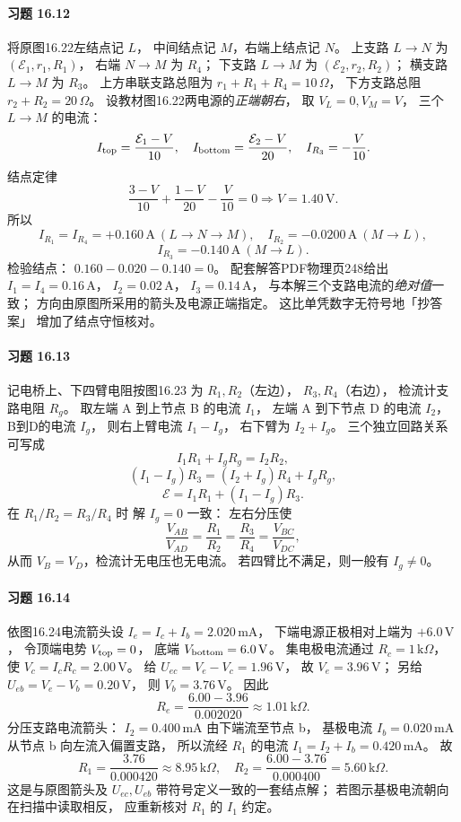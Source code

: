 \paragraph{习题 16.12}
将原图16.22左结点记 \(L\)，
中间结点记 \(M\)，右端上结点记 \(N\)。
上支路 \(L\to N\)
为 \((\mathcal E_1,r_1,R_1)\)，
右端 \(N\to M\) 为 \(R_4\)；
下支路 \(L\to M\)
为 \((\mathcal E_2,r_2,R_2)\)；
横支路 \(L\to M\) 为 \(R_3\)。
上方串联支路总阻为
\(r_1+R_1+R_4=10\,\Omega\)，
下方支路总阻 \(r_2+R_2=20\,\Omega\)。
设教材图16.22两电源的\emph{正端朝右}，
取 \(V_L=0,V_M=V\)，
三个 \(L\to M\) 的电流：
\[
 I_{\rm top}=\frac{\mathcal E_1-V}{10},\quad
 I_{\rm bottom}=\frac{\mathcal E_2-V}{20},\quad
 I_{R_3}=-\frac V{10}.
\]
结点定律
\[
 \frac{3-V}{10}+\frac{1-V}{20}
 -\frac V{10}=0
 \Longrightarrow
 \boxed{V=1.40\,\mathrm V}.
\]
所以
\[
 \boxed{I_{R_1}=I_{R_4}=+0.160\,\mathrm A
 \ (L\to N\to M)},\quad
 \boxed{I_{R_2}=-0.0200\,\mathrm A
 \ (M\to L)},
\]
\[
 \boxed{I_{R_3}=-0.140\,\mathrm A
 \ (M\to L)}.
\]
检验结点：
\(0.160-0.020-0.140=0\)。
配套解答PDF物理页248给出
\(I_1=I_4=0.16\,\mathrm A\)，
\(I_2=0.02\,\mathrm A\)，
\(I_3=0.14\,\mathrm A\)，
与本解三个支路电流的\emph{绝对值}一致；
方向由原图所采用的箭头及电源正端指定。
这比单凭数字无符号地「抄答案」
增加了结点守恒核对。

\paragraph{习题 16.13}
记电桥上、下四臂电阻按图16.23
为 \(R_1,R_2\)（左边），
\(R_3,R_4\)（右边），
检流计支路电阻 \(R_g\)。
取左端 A 到上节点 B 的电流 \(I_1\)，
左端 A 到下节点 D 的电流 \(I_2\)，
B到D的电流 \(I_g\)，
则右上臂电流 \(I_1-I_g\)，
右下臂为 \(I_2+I_g\)。
三个独立回路关系可写成
\[
 I_1R_1+I_gR_g=I_2R_2,
\]
\[
 (I_1-I_g)R_3=(I_2+I_g)R_4+I_gR_g,
\]
\[
 \mathcal E=I_1R_1+(I_1-I_g)R_3.
\]
在
\(R_1/R_2=R_3/R_4\) 时
解 \(I_g=0\) 一致：
左右分压使
\[
 \frac{V_{AB}}{V_{AD}}=
 \frac{R_1}{R_2}
 =\frac{R_3}{R_4}
 =\frac{V_{BC}}{V_{DC}},
\]
从而 \(V_B=V_D\)，检流计无电压也无电流。
若四臂比不满足，则一般有 \(I_g\ne0\)。

\paragraph{习题 16.14}
依图16.24电流箭头设
\(I_e=I_c+I_b=2.020\,\mathrm{mA}\)，
下端电源正极相对上端为
\(+6.0\,\mathrm V\)，
令顶端电势 \(V_{\rm top}=0\)，
底端 \(V_{\rm bottom}=6.0\,\mathrm V\)。
集电极电流通过
\(R_c=1\,\mathrm{k}\Omega\)，
使
\(V_c=I_cR_c=2.00\,\mathrm V\)。
给
\(U_{ec}=V_e-V_c=1.96\,\mathrm V\)，
故 \(V_e=3.96\,\mathrm V\)；
另给
\(U_{eb}=V_e-V_b=0.20\,\mathrm V\)，
则 \(V_b=3.76\,\mathrm V\)。
因此
\[
 \boxed{R_e=\frac{6.00-3.96}{0.002020}
 \approx1.01\,\mathrm{k}\Omega}.
\]
分压支路电流箭头：
\(I_2=0.400\,\mathrm{mA}\)
由下端流至节点 b，
基极电流 \(I_b=0.020\,\mathrm{mA}\)
从节点 b 向左流入偏置支路，
所以流经 \(R_1\) 的电流
\(I_1=I_2+I_b=0.420\,\mathrm{mA}\)。
故
\[
 \boxed{R_1=\frac{3.76}{0.000420}
 \approx8.95\,\mathrm{k}\Omega},\quad
 \boxed{R_2=\frac{6.00-3.76}{0.000400}
 =5.60\,\mathrm{k}\Omega}.
\]
这是与原图箭头及 \(U_{ec},U_{eb}\)
带符号定义一致的一套结点解；
若图示基极电流朝向在扫描中读取相反，
应重新核对 \(R_1\) 的 \(I_1\) 约定。

